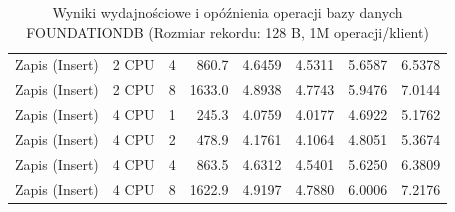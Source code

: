 \begin{table}[ht]
{\begin{tabular}{llcrrrrr}
Zapis (Insert) & 2 CPU & 4 & 860.7 & 4.6459 & 4.5311 & 5.6587 & 6.5378 \\
Zapis (Insert) & 2 CPU & 8 & 1633.0 & 4.8938 & 4.7743 & 5.9476 & 7.0144 \\
Zapis (Insert) & 4 CPU & 1 & 245.3 & 4.0759 & 4.0177 & 4.6922 & 5.1762 \\
Zapis (Insert) & 4 CPU & 2 & 478.9 & 4.1761 & 4.1064 & 4.8051 & 5.3674 \\
Zapis (Insert) & 4 CPU & 4 & 863.5 & 4.6312 & 4.5401 & 5.6250 & 6.3809 \\
Zapis (Insert) & 4 CPU & 8 & 1622.9 & 4.9197 & 4.7880 & 6.0006 & 7.2176 \\
\bottomrule
\end{tabular}%
}
\caption{Wyniki wydajnościowe i opóźnienia operacji bazy danych FOUNDATIONDB (Rozmiar rekordu: 128 B, 1M operacji/klient)}
\label{tab:latency_foundationdb_small_1000000}
\end{table}
